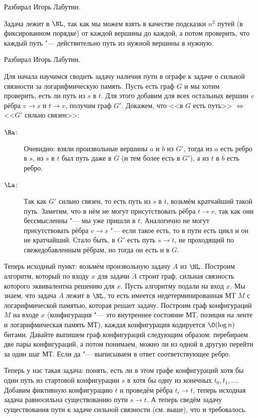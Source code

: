 	Разбирал Игорь Лабутин.

	Задача лежит в $\NL$, так как мы можем взять в качестве подсказки
	$n^2$ путей (в фиксированном порядке) от каждой вершины до каждой,
	а потом проверить, что каждый путь "--- действительно путь из нужной вершины
	в нужную.

	Разбирал Игорь Лабутин.

	Для начала научимся сводить задачу наличия пути в ографе к
	задаче о сильной связности за логарифмическую память.
	Пусть есть граф $G$ и мы хотим проверить, есть ли путь из $s$ в $t$.
	Для этого добавим для всех остальных вершин $v$ рёбра $v \to s$ и $t \to v$,
	получим граф $G'$.
	Докажем, что <<в $G$ есть путь>> $\iff$ <<$G'$ сильно связен>>:
	\begin{description}
		\item[$\Ra$:]
			Очевидно: взяли произвольные вершины $a$ и $b$ из $G'$,
			тогда из $a$ есть ребро в $s$, из $s$ в $t$ был путь даже в
			$G$ (и тем более есть в $G'$), а из $t$ в $b$ есть ребро.
		\item[$\La$:]
			Так как $G'$ сильно связен, то есть путь из $s$ в $t$,
			возьмём кратчайший такой путь.
			Заметим, что в нём не могут присутствовать рёбра $t \to v$,
			так как они бессмысленны "--- мы уже пришли в $t$.
			Аналогично не могут присутствовать рёбра $v \to s$ "---
			если такое есть, то в пути есть цикл и он не кратчайший.
			Стало быть, в $G'$ есть путь $s \to t$, не проходящий по свежедобавленным рёбрам,
			но тогда он есть и в $G$.
	\end{description}

	Теперь исходный пункт: возьмём произвольную задачу $A$ из $\NL$.
	Построим алгоритм, который по входу $x$ для задачи $A$ строит
	граф, сильная связность которого эквивалентна решению для $x$.
	Пусть алгоритму подали на вход $x$.
	Мы знаем, что задача $A$ лежит в $\NL$, то есть имеется недетерминированная
	МТ $M$ с логарифмической памятью, которая решает задачу.
	Построим граф конфигураций $M$ на входе $x$ (конфигурация "--- это внутреннее
	состояние МТ, позиция на ленте и логарифмическая память МТ), каждая
	конфигурация кодируется $\O(\log n)$ битами.
	Давайте выпишем граф конфигураций следующим образом: перебираем две пары конфигураций,
	а потом понимаем, можно ли из одной в другую перейти за один шаг МТ.
	Если да "--- выписываем в ответ соответствующее ребро.

	Теперь у нас такая задача: понять, есть ли в этом графе конфигураций хотя бы один
	путь из стартовой конфигурации $s$ в хотя бы одну из конечных $t_0, t_1, \dots$.
	Добавим фиктивную конфигурацию $t$ и проведём рёбра $t_i \to t$, теперь исходная
	задача равносильна существованию пути $s \to t$.
	А теперь сведём задачу существования пути к задаче сильной связности (см. выше),
	что и требовалось.

